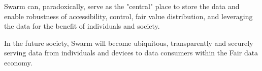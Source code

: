 Swarm can, paradoxically, serve as the "central" place to store the data and enable robustness of accessibility, control, fair value distribution, and leveraging the data for the benefit of individuals and society.

In the future society, Swarm will become ubiquitous, transparently and securely serving data from individuals and devices to data consumers within the Fair data economy.

